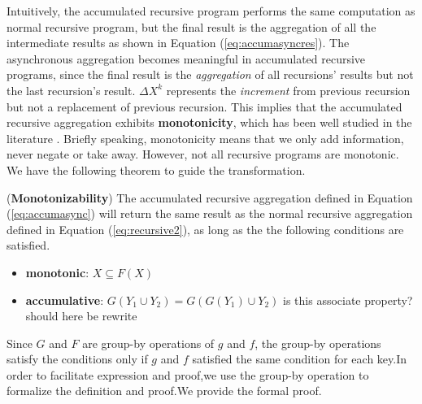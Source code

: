 {\color{green}
Intuitively, the accumulated recursive program performs the same computation as normal recursive program, but the final result is the aggregation of all the intermediate results as shown in Equation (\ref{eq:accumasyncres}). The asynchronous aggregation becomes meaningful in accumulated recursive programs, since the final result is the \emph{aggregation} of all recursions' results but not the last recursion's result. $\Delta X^{k}$ represents the \emph{increment} from previous recursion but not a replacement of previous recursion. This implies that the accumulated recursive aggregation exhibits \textbf{monotonicity}, which has been well studied in the literature \cite{Hellerstein:2010:DIE:1860702.1860704,calm,Lam:2013:SDE:2510649.2511289,Wang:2015:AFR:2824032.2824052}. Briefly speaking, monotonicity means that we only add information, never negate or take away. However, not all recursive programs are monotonic. We have the following theorem to guide the transformation.
}
\begin{definition}
	\label{th:monotone}
	(\textbf{Monotonizability}) The accumulated recursive aggregation defined in Equation (\ref{eq:accumasync}) will return the same result as the normal recursive aggregation defined in Equation (\ref{eq:recursive2}), as long as the the following conditions are satisfied.
	\begin{itemize}
		\item \textbf{monotonic}: $X\subseteq F(X)$
		\item \textbf{accumulative}: $G(Y_1\cup Y_2)=G(G(Y_1)\cup Y_2)${\color{red}  is this associate property? should here be rewrite}
	\end{itemize}
	
\end{definition}
{\color{green}
Since $G$ and $F$ are group-by operations of $g$ and $f$, the group-by operations satisfy the conditions only if $g$ and $f$ satisfied the same condition for each key.In order to facilitate expression and proof,we use the group-by operation to formalize the definition and proof.We provide the formal proof.
}
